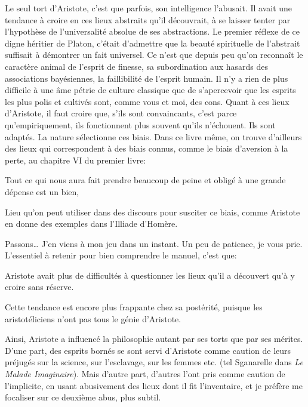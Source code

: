 Le seul tort d'Aristote, c'est que parfois, son intelligence l'abusait. Il avait une tendance à croire en ces lieux
abstraits qu'il découvrait, à se laisser tenter par l'hypothèse de l'universalité absolue de ses abstractions.
Le premier réflexe de ce digne héritier de Platon, c'était d'admettre que la beauté spirituelle de l'abstrait suffisait
à démontrer un fait universel. Ce n'est que depuis peu qu'on reconnaît le caractère animal de l'esprit de finesse, sa
subordination aux hasards des associations bayésiennes, la faillibilité de l'esprit humain. Il n'y a rien de plus
difficile à une âme pétrie de culture classique que de s'apercevoir que les esprits les plus polis et cultivés sont,
comme vous et moi, des cons. Quant à ces lieux d'Aristote, il faut croire que, s'ils sont convaincants, c'est parce
qu'empiriquement, ils fonctionnent plus souvent qu'ils n'échouent. Ils sont adaptés. La nature sélectionne ces biais.
Dans ce livre même, on trouve d'ailleurs des lieux qui correspondent à des biais connus, comme le biais d'aversion à
la perte, au chapitre VI du premier livre:

\begin{lieu}
	Tout ce qui nous aura fait prendre beaucoup de peine et obligé à une grande dépense est un bien,
\end{lieu}

Lieu qu'on peut utiliser dans des discours pour susciter ce biais, comme Aristote en donne des exemples dans l'Illiade
d'Homère.

Passons\dots{} J'en viens à mon jeu dans un instant. Un peu de patience, je vous prie. L'essentiel à retenir pour
bien comprendre le manuel, c'est que:

\begin{emphpar}
	Aristote avait plus de difficultés à questionner les lieux qu'il a découvert qu'à y croire sans réserve.

	Cette tendance est encore plus frappante chez sa postérité, puisque les aristotéliciens n'ont pas tous le génie
	d'Aristote.

	Ainsi, Aristote a influencé la philosophie autant par ses torts que par ses mérites. D'une part, des esprits
	bornés se sont servi d'Aristote comme caution de leurs préjugés sur la science, sur l'esclavage, sur les femmes
	etc. (tel Sganarelle dans \emph{Le Malade Imaginaire}). Mais d'autre part, d'autres l'ont pris comme caution de
	l'implicite, en usant abusivement des lieux dont il fit l'inventaire, et je préfère me focaliser sur ce deuxième
	abus, plus subtil.
\end{emphpar}

